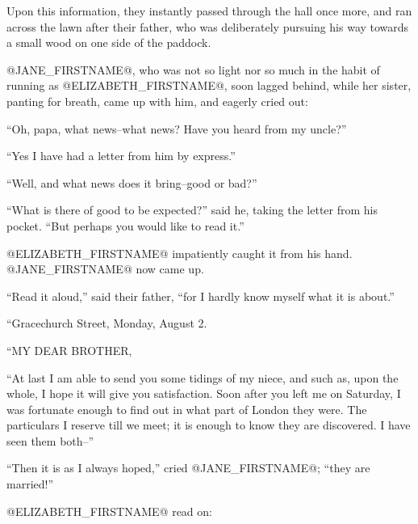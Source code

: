 Upon this information, they instantly passed through the hall once
more, and ran across the lawn after their father, who was deliberately
pursuing his way towards a small wood on one side of the paddock.

@JANE_FIRSTNAME@, who was not so light nor so much in the habit of running as
@ELIZABETH_FIRSTNAME@, soon lagged behind, while her sister, panting for breath,
came up with him, and eagerly cried out:

``Oh, papa, what news--what news? Have you heard from my uncle?''

``Yes I have had a letter from him by express.''

``Well, and what news does it bring--good or bad?''

``What is there of good to be expected?'' said he, taking the letter from
his pocket. ``But perhaps you would like to read it.''

@ELIZABETH_FIRSTNAME@ impatiently caught it from his hand. @JANE_FIRSTNAME@ now came up.

``Read it aloud,'' said their father, ``for I hardly know myself what it is
about.''

``Gracechurch Street, Monday, August 2.

``MY DEAR BROTHER,

``At last I am able to send you some tidings of my niece, and such as,
upon the whole, I hope it will give you satisfaction. Soon after you
left me on Saturday, I was fortunate enough to find out in what part of
London they were. The particulars I reserve till we meet; it is enough
to know they are discovered. I have seen them both--''

``Then it is as I always hoped,'' cried @JANE_FIRSTNAME@; ``they are married!''

@ELIZABETH_FIRSTNAME@ read on:

